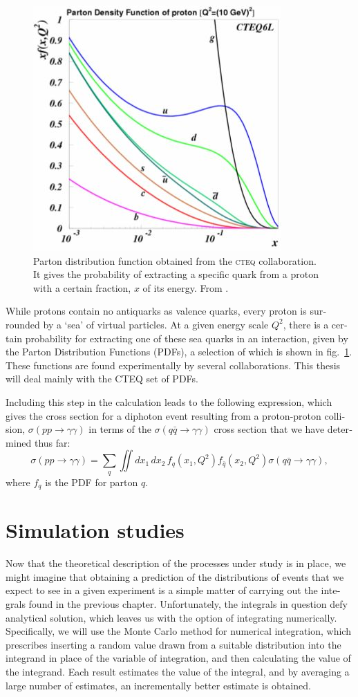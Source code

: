\begin{english}
\begin{figure}[hbt]
\includegraphics[width=.55\textwidth]{pdf}\hfill\parbox[b]{.44\textwidth}{
\caption{Parton distribution function obtained from the \textsc{cteq} collaboration. It gives the probability of extracting a specific quark from a proton with a certain fraction, $x$ of its energy. From \cite{scien2}.\label{pdff}}}
\end{figure}

While protons contain no antiquarks as valence quarks, every proton is surrounded by a `sea' of virtual particles. At a given energy scale $Q^2$, there is a certain probability for extracting one of these sea quarks in an interaction, given by the Parton Distribution Functions (PDFs), a selection of which is shown in fig.~\ref{pdff}. These functions are found experimentally by several collaborations. This thesis will deal mainly with the CTEQ set of PDFs.

Including this step in the calculation leads to the following expression, which gives the cross section for a diphoton event resulting from a proton-proton collision, $\sigma(pp\rightarrow\gamma\gamma)$ in terms of the $\sigma(q\bar q \rightarrow \gamma\gamma)$ cross section that we have determined thus far:
\[\sigma(pp\rightarrow\gamma\gamma)=\sum_q\iint dx_1\,dx_2\,f_q(x_1,Q^2)f_{\bar q}(x_2,Q^2)\sigma(q\bar q\rightarrow\gamma\gamma),\label{pdf}\]
where $f_q$ is the PDF for parton $q$.


\chapter{Simulation studies}\label{ch.mc}

Now that the theoretical description of the processes under study is in place, we might imagine that obtaining a prediction of the distributions of events that we expect to see in a given experiment is a simple matter of carrying out the integrals found in the previous chapter. Unfortunately, the integrals in question defy analytical solution, which leaves us with the option of integrating numerically. Specifically, we will use the Monte Carlo method for numerical integration, which prescribes inserting a random value drawn from a suitable distribution into the integrand in place of the variable of integration, and then calculating the value of the integrand. Each result estimates the value of the integral, and by averaging a large number of estimates, an incrementally better estimate is obtained.


\end{english}
